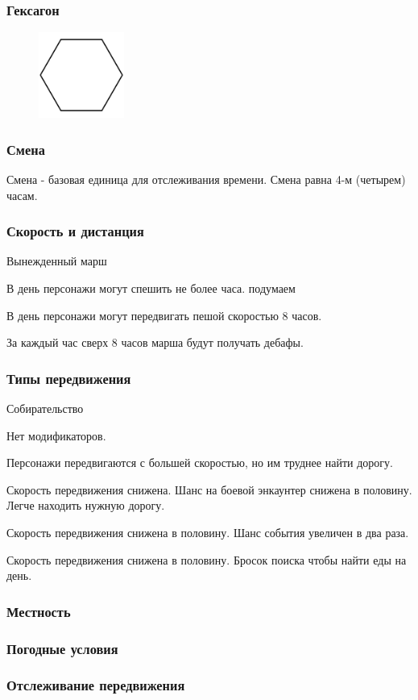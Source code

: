\subsubsection*{Гексагон}
\begin{figure}[H]
  \centering
  \includegraphics*[width=0.25\textwidth]{./img/hexagon.pdf}
\end{figure}

\subsubsection*{Смена}
Смена - базовая единица для отслеживания времени. Смена равна 4-м (четырем) часам.

\subsubsection*{Скорость и дистанция}

\begin{mydescription}{Вынежденный марш}
  \item[Спешка] В день персонажи могут спешить не более часа. подумаем
  \item[Марш] В день персонажи могут передвигать пешой скоростью 8 часов.
  \item[Форсированный марш] За каждый час сверх 8 часов марша будут получать дебафы.
\end{mydescription}

\subsubsection*{Типы передвижения}
\begin{mydescription}{Собирательство}
  \item[Спокойное] Нет модификаторов.
  \item[Спешка] Персонажи передвигаются с большей скоростью, но им труднее найти дорогу.
  \item[Осторожное] Скорость передвижения снижена. Шанс на боевой энкаунтер снижена в половину.
  Легче находить нужную дорогу.
  \item[Исследование] Скорость передвижения снижена в половину. Шанс события увеличен в два раза.
  \item[Собирательство] Скорость передвижения снижена в половину. Бросок поиска чтобы найти еды на день.
\end{mydescription}

\subsubsection*{Местность}

\subsubsection*{Погодные условия}

\subsubsection*{Отслеживание передвижения}
